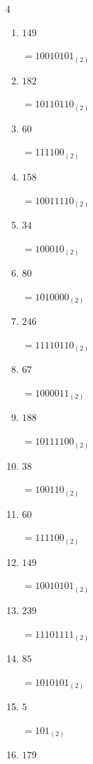 \begin{multicols}{4}
\begin{enumerate}
        $=110_{(2)}$

  \item $149$

        $=10010101_{(2)}$

  \item $182$

        $=10110110_{(2)}$

  \item $60$

        $=111100_{(2)}$

  \item $158$

        $=10011110_{(2)}$

  \item $34$

        $=100010_{(2)}$

  \item $80$

        $=1010000_{(2)}$

  \item $246$

        $=11110110_{(2)}$

  \item $67$

        $=1000011_{(2)}$

  \item $188$

        $=10111100_{(2)}$

  \item $38$

        $=100110_{(2)}$

\columnbreak %

  \item $60$

        $=111100_{(2)}$

  \item $149$

        $=10010101_{(2)}$

  \item $239$

        $=11101111_{(2)}$

  \item $85$

        $=1010101_{(2)}$

  \item $5$

        $=101_{(2)}$

  \item $179$


\end{enumerate}
\end{multicols}
